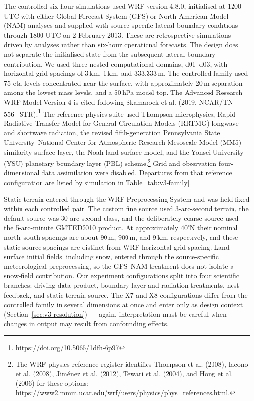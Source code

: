 \documentclass[air,article,submit,moreauthors]{Definitions/mdpi}
\begin{document}
The controlled six-hour simulations used WRF version 4.8.0, initialised at 1200 UTC with either Global Forecast System (GFS) or North American Model (NAM) analyses and supplied with source-specific lateral boundary conditions through 1800 UTC on 2 February 2013.
These are retrospective simulations driven by analyses rather than six-hour operational forecasts.
The design does not separate the initialised state from the subsequent lateral-boundary contribution.
We used three nested computational domains, d01--d03, with horizontal grid spacings of 3\,km, 1\,km, and 333.333\,m.
The controlled family used 75 eta levels concentrated near the surface, with approximately 20\,m separation among the lowest mass levels, and a 50\,hPa model top.
The Advanced Research WRF Model Version 4 is cited following Skamarock et al. (2019, NCAR/TN-556+STR).\footnote{\url{https://doi.org/10.5065/1dfh-6p97}}
The reference physics suite used Thompson microphysics, Rapid Radiative Transfer Model for General Circulation Models (RRTMG) longwave and shortwave radiation, the revised fifth-generation Pennsylvania State University--National Center for Atmospheric Research Mesoscale Model (MM5) similarity surface layer, the Noah land-surface model, and the Yonsei University (YSU) planetary boundary layer (PBL) scheme.\footnote{The WRF physics-reference register identifies Thompson et al. (2008), Iacono et al. (2008), Jim\'enez et al. (2012), Tewari et al. (2004), and Hong et al. (2006) for these options: \url{https://www2.mmm.ucar.edu/wrf/users/physics/phys_references.html}.}
Grid and observation four-dimensional data assimilation were disabled.
Departures from that reference configuration are listed by simulation in Table~\ref{tab:v3-family}.

Static terrain entered through the WRF Preprocessing System and was held fixed within each controlled pair.
The custom fine source used 3-arc-second terrain, the default source was 30-arc-second class, and the deliberately coarse source used the 5-arc-minute GMTED2010 product.
At approximately $40^{\circ}$N their nominal north--south spacings are about 90\,m, 900\,m, and 9\,km, respectively, and these static-source spacings are distinct from WRF horizontal grid spacing.
Land-surface initial fields, including snow, entered through the source-specific meteorological preprocessing, so the GFS--NAM treatment does not isolate a snow-field contribution.
Our experiment configurations split into four scientific branches: driving-data product, boundary-layer and radiation treatments, nest feedback, and static-terrain source.
The X7 and X8 configurations differ from the controlled family in several dimensions at once and enter only as design context (Section~\ref{sec:v3-resolution}) --- again, interpretation must be careful when changes in output may result from confounding effects.
\end{document}
